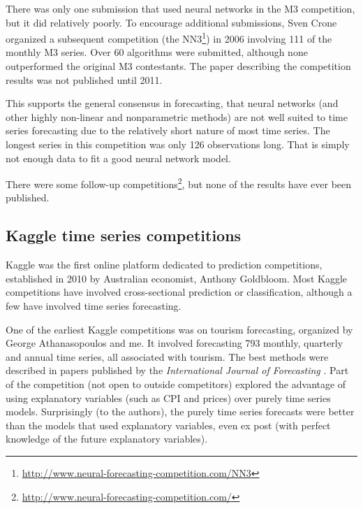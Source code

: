 \documentclass[11pt,a4paper,]{article}
\begin{document}
There was only one submission that used neural networks in the M3 competition, but it did relatively poorly. To encourage additional submissions, Sven Crone organized a subsequent competition (the NN3\footnote{\url{http://www.neural-forecasting-competition.com/NN3}}) in 2006 involving 111 of the monthly M3 series. Over 60 algorithms were submitted, although none outperformed the original M3 contestants. The paper describing the competition results \autocite{NN3} was not published until 2011.

This supports the general consensus in forecasting, that neural networks (and other highly non-linear and nonparametric methods) are not well suited to time series forecasting due to the relatively short nature of most time series. The longest series in this competition was only 126 observations long. That is simply not enough data to fit a good neural network model.

There were some follow-up competitions\footnote{\url{http://www.neural-forecasting-competition.com/}}, but none of the results have ever been published.

\hypertarget{kaggle-time-series-competitions}{%
\subsection*{Kaggle time series competitions}\label{kaggle-time-series-competitions}}

Kaggle was the first online platform dedicated to prediction competitions, established in 2010 by Australian economist, Anthony Goldbloom. Most Kaggle competitions have involved cross-sectional prediction or classification, although a few have involved time series forecasting.

One of the earliest Kaggle competitions was on tourism forecasting, organized by George Athanasopoulos and me. It involved forecasting 793 monthly, quarterly and annual time series, all associated with tourism. The best methods were described in papers published by the \emph{International Journal of Forecasting} \autocite{AHSW11}. Part of the competition (not open to outside competitors) explored the advantage of using explanatory variables (such as CPI and prices) over purely time series models. Surprisingly (to the authors), the purely time series forecasts were better than the models that used explanatory variables, even ex post (with perfect knowledge of the future explanatory variables).
\end{document}

